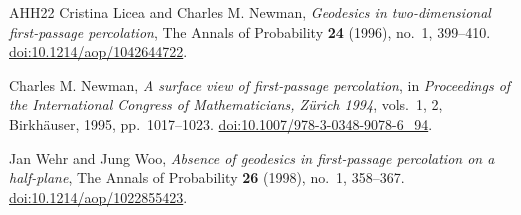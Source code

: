 \begin{thebibliography}{AHH22}
Cristina Licea and Charles M. Newman,
\emph{Geodesics in two-dimensional first-passage percolation},
The Annals of Probability \textbf{24} (1996), no.~1, 399--410.
\href{https://doi.org/10.1214/aop/1042644722}{doi:10.1214/aop/1042644722}.

Charles M. Newman,
\emph{A surface view of first-passage percolation},
in \emph{Proceedings of the International Congress of Mathematicians, Z\"urich 1994},
vols.~1, 2, Birkh\"auser, 1995, pp.~1017--1023.
\href{https://doi.org/10.1007/978-3-0348-9078-6_94}{doi:10.1007/978-3-0348-9078-6\_94}.

Jan Wehr and Jung Woo,
\emph{Absence of geodesics in first-passage percolation on a half-plane},
The Annals of Probability \textbf{26} (1998), no.~1, 358--367.
\href{https://doi.org/10.1214/aop/1022855423}{doi:10.1214/aop/1022855423}.

\end{thebibliography}
